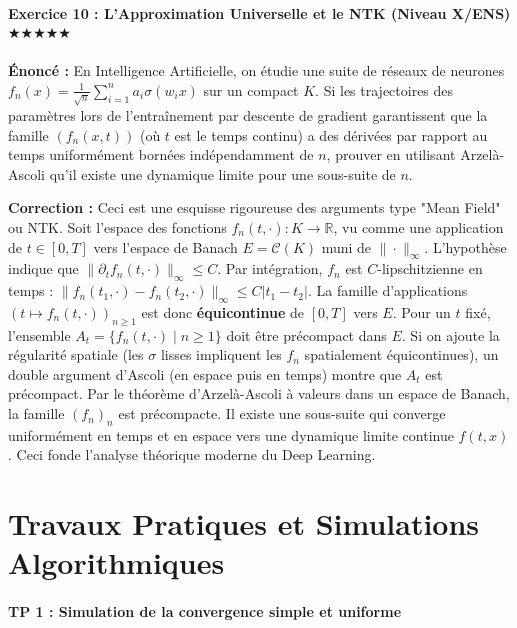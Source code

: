 \documentclass[11pt,a4paper]{article}
\begin{document}
\subsection*{Exercice 10 : L'Approximation Universelle et le NTK (Niveau X/ENS) \quad $\bigstar\bigstar\bigstar\bigstar\bigstar$}

\textbf{Énoncé :}
En Intelligence Artificielle, on étudie une suite de réseaux de neurones $f_n(x) = \frac{1}{\sqrt{n}} \sum_{i=1}^n a_i \sigma(w_i x)$ sur un compact $K$. Si les trajectoires des paramètres lors de l'entraînement par descente de gradient garantissent que la famille $(f_n(x, t))$ (où $t$ est le temps continu) a des dérivées par rapport au temps uniformément bornées indépendamment de $n$, prouver en utilisant Arzelà-Ascoli qu'il existe une dynamique limite pour une sous-suite de $n$.

\textbf{Correction :}
Ceci est une esquisse rigoureuse des arguments type "Mean Field" ou NTK.
Soit l'espace des fonctions $f_n(t, \cdot) : K \to \mathbb{R}$, vu comme une application de $t \in [0, T]$ vers l'espace de Banach $E = \mathcal{C}(K)$ muni de $\| \cdot \|_\infty$.
L'hypothèse indique que $\|\partial_t f_n(t, \cdot)\|_\infty \le C$.
Par intégration, $f_n$ est $C$-lipschitzienne en temps : $\|f_n(t_1, \cdot) - f_n(t_2, \cdot)\|_\infty \le C |t_1 - t_2|$.
La famille d'applications $(t \mapsto f_n(t, \cdot))_{n \ge 1}$ est donc \textbf{équicontinue} de $[0, T]$ vers $E$.
Pour un $t$ fixé, l'ensemble $A_t = \{f_n(t, \cdot) \mid n \ge 1\}$ doit être précompact dans $E$.
Si on ajoute la régularité spatiale (les $\sigma$ lisses impliquent les $f_n$ spatialement équicontinues), un double argument d'Ascoli (en espace puis en temps) montre que $A_t$ est précompact.
Par le théorème d'Arzelà-Ascoli à valeurs dans un espace de Banach, la famille $(f_n)_{n}$ est précompacte. Il existe une sous-suite qui converge uniformément en temps et en espace vers une dynamique limite continue $f(t, x)$. Ceci fonde l'analyse théorique moderne du Deep Learning.




\newpage
\part{Travaux Pratiques et Simulations Algorithmiques}

\subsection*{TP 1 : Simulation de la convergence simple et uniforme}
\end{document}
